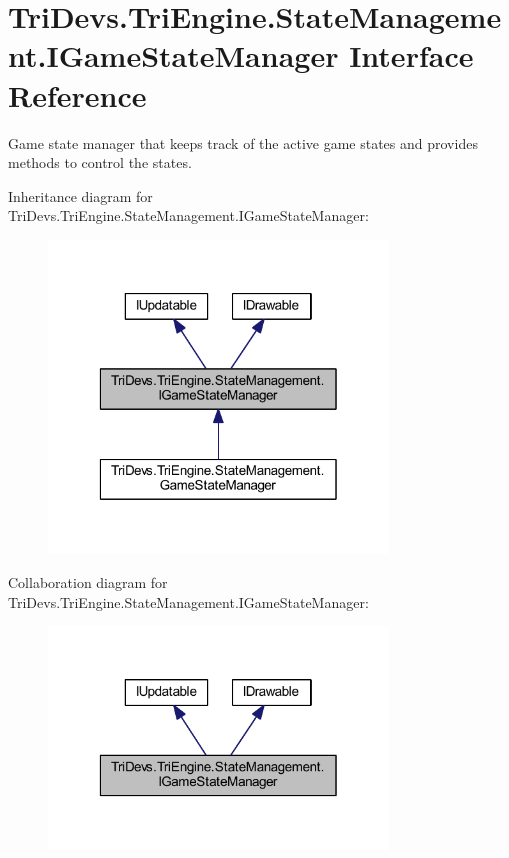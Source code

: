 \hypertarget{interface_tri_devs_1_1_tri_engine_1_1_state_management_1_1_i_game_state_manager}{\section{Tri\-Devs.\-Tri\-Engine.\-State\-Management.\-I\-Game\-State\-Manager Interface Reference}
\label{interface_tri_devs_1_1_tri_engine_1_1_state_management_1_1_i_game_state_manager}
}


Game state manager that keeps track of the active game states and provides methods to control the states.  




Inheritance diagram for Tri\-Devs.\-Tri\-Engine.\-State\-Management.\-I\-Game\-State\-Manager\-:
\nopagebreak
\begin{figure}[H]
\begin{center}
\leavevmode
\includegraphics[width=256pt]{interface_tri_devs_1_1_tri_engine_1_1_state_management_1_1_i_game_state_manager__inherit__graph}
\end{center}
\end{figure}


Collaboration diagram for Tri\-Devs.\-Tri\-Engine.\-State\-Management.\-I\-Game\-State\-Manager\-:
\nopagebreak
\begin{figure}[H]
\begin{center}
\leavevmode
\includegraphics[width=256pt]{interface_tri_devs_1_1_tri_engine_1_1_state_management_1_1_i_game_state_manager__coll__graph}
\end{center}
\end{figure}
